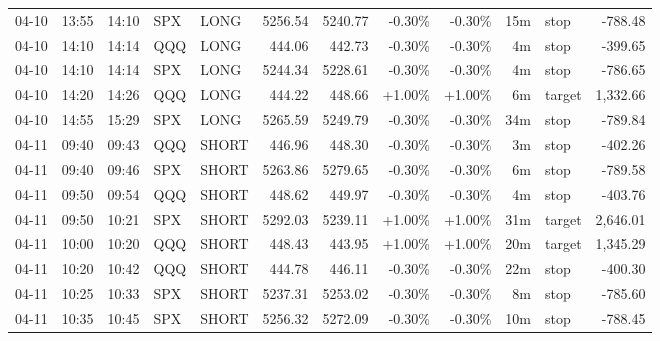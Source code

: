 \documentclass[11pt,a4paper,twoside]{article}
\begin{document}
\begin{center}
\begin{longtable}{>{\color{txtmain}}l l l l l r r r r r >{\color{txtmain}}l r}
04-10 & 13:55 & 14:10 & SPX & LONG & 5256.54 & 5240.77 & \textcolor{lossred}{-0.30\%} & \textcolor{lossred}{-0.30\%} & 15m & stop & \textcolor{lossred}{-788.48} \\
04-10 & 14:10 & 14:14 & QQQ & LONG & 444.06 & 442.73 & \textcolor{lossred}{-0.30\%} & \textcolor{lossred}{-0.30\%} & 4m & stop & \textcolor{lossred}{-399.65} \\
04-10 & 14:10 & 14:14 & SPX & LONG & 5244.34 & 5228.61 & \textcolor{lossred}{-0.30\%} & \textcolor{lossred}{-0.30\%} & 4m & stop & \textcolor{lossred}{-786.65} \\
04-10 & 14:20 & 14:26 & QQQ & LONG & 444.22 & 448.66 & \textcolor{wingreen}{+1.00\%} & \textcolor{wingreen}{+1.00\%} & 6m & target & \textcolor{wingreen}{1,332.66} \\
04-10 & 14:55 & 15:29 & SPX & LONG & 5265.59 & 5249.79 & \textcolor{lossred}{-0.30\%} & \textcolor{lossred}{-0.30\%} & 34m & stop & \textcolor{lossred}{-789.84} \\
04-11 & 09:40 & 09:43 & QQQ & SHORT & 446.96 & 448.30 & \textcolor{lossred}{-0.30\%} & \textcolor{lossred}{-0.30\%} & 3m & stop & \textcolor{lossred}{-402.26} \\
04-11 & 09:40 & 09:46 & SPX & SHORT & 5263.86 & 5279.65 & \textcolor{lossred}{-0.30\%} & \textcolor{lossred}{-0.30\%} & 6m & stop & \textcolor{lossred}{-789.58} \\
04-11 & 09:50 & 09:54 & QQQ & SHORT & 448.62 & 449.97 & \textcolor{lossred}{-0.30\%} & \textcolor{lossred}{-0.30\%} & 4m & stop & \textcolor{lossred}{-403.76} \\
04-11 & 09:50 & 10:21 & SPX & SHORT & 5292.03 & 5239.11 & \textcolor{wingreen}{+1.00\%} & \textcolor{wingreen}{+1.00\%} & 31m & target & \textcolor{wingreen}{2,646.01} \\
04-11 & 10:00 & 10:20 & QQQ & SHORT & 448.43 & 443.95 & \textcolor{wingreen}{+1.00\%} & \textcolor{wingreen}{+1.00\%} & 20m & target & \textcolor{wingreen}{1,345.29} \\
04-11 & 10:20 & 10:42 & QQQ & SHORT & 444.78 & 446.11 & \textcolor{lossred}{-0.30\%} & \textcolor{lossred}{-0.30\%} & 22m & stop & \textcolor{lossred}{-400.30} \\
04-11 & 10:25 & 10:33 & SPX & SHORT & 5237.31 & 5253.02 & \textcolor{lossred}{-0.30\%} & \textcolor{lossred}{-0.30\%} & 8m & stop & \textcolor{lossred}{-785.60} \\
04-11 & 10:35 & 10:45 & SPX & SHORT & 5256.32 & 5272.09 & \textcolor{lossred}{-0.30\%} & \textcolor{lossred}{-0.30\%} & 10m & stop & \textcolor{lossred}{-788.45} \\

\end{longtable}
\end{center}
\end{document}
